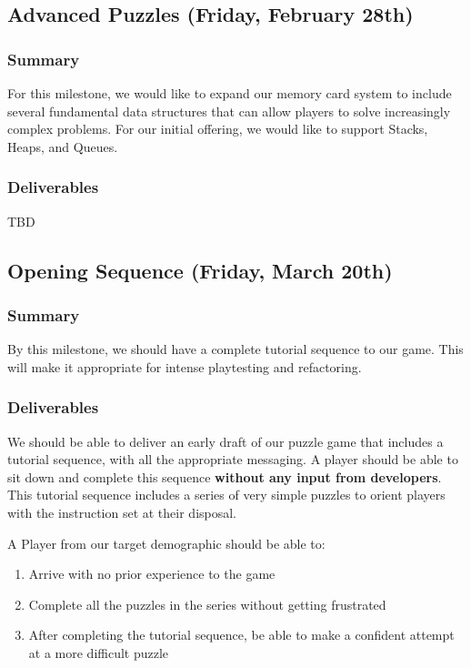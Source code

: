 \subsection{Advanced Puzzles (Friday, February 28th)}

\subsubsection*{Summary}
For this milestone, we would like to expand our memory card system to include
several fundamental data structures that can allow players to solve increasingly
complex problems. For our initial offering, we would like to support Stacks,
Heaps, and Queues.

\subsubsection*{Deliverables}
TBD

\subsection{Opening Sequence (Friday, March 20th)}

\subsubsection*{Summary}
By this milestone, we should have a complete tutorial sequence to our game. This
will make it appropriate for intense playtesting and refactoring.

\subsubsection*{Deliverables}
We should be able to deliver an early draft of our puzzle game that includes a
tutorial sequence, with all the appropriate messaging. A player should be able
to sit down and complete this sequence \textbf{without any input from developers}.
This tutorial sequence includes a series of very simple puzzles to orient
players with the instruction set at their disposal.

A Player from our target demographic should be able to:
\begin{enumerate}
  \item Arrive with no prior experience to the game
  \item Complete all the puzzles in the series without getting frustrated
  \item After completing the tutorial sequence, be able to make a confident
  attempt at a more difficult puzzle
\end{enumerate}

